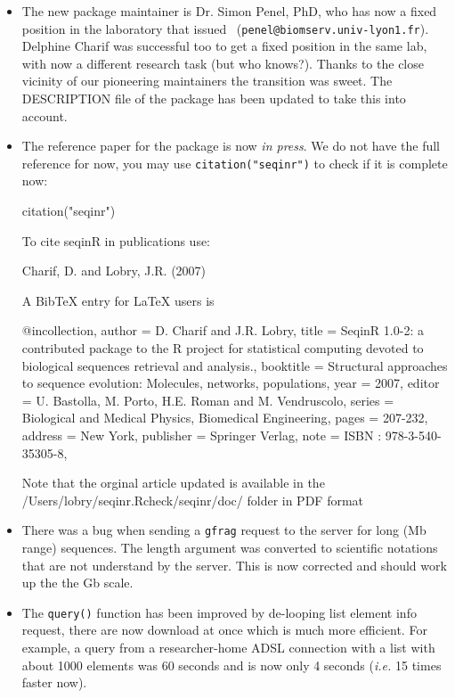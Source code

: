 \documentclass{article}
\begin{document}
\begin{itemize}
\item The new package maintainer is Dr. Simon Penel, PhD, who has now a fixed position in the
laboratory that issued \seqinr~(\texttt{penel@biomserv.univ-lyon1.fr}). Delphine Charif was
successful too to get a fixed position in the same lab, with now a different research task (but who knows?).
Thanks to the close vicinity of our pioneering maintainers the transition was sweet. The DESCRIPTION
file of the \seqinr{} package has been updated to take this into account.

\item The reference paper for the package is now \textit{in press}. We do not have the full
reference for now, you may use \texttt{citation("seqinr")} to check if it is complete now:
\begin{Schunk}
\begin{Sinput}
 citation("seqinr")
\end{Sinput}
\begin{Soutput}
To cite seqinR in publications use:

  Charif, D. and Lobry, J.R. (2007)

A BibTeX entry for LaTeX users is

  @incollection{,
    author = {D. Charif and J.R. Lobry},
    title = {Seqin{R} 1.0-2: a contributed package to the {R} project for statistical computing devoted to biological sequences retrieval and analysis.},
    booktitle = {Structural approaches to sequence evolution: Molecules, networks, populations},
    year = {2007},
    editor = {U. Bastolla, M. Porto, H.E. Roman and M. Vendruscolo},
    series = {Biological and Medical Physics, Biomedical Engineering},
    pages = {207-232},
    address = {New York},
    publisher = {Springer Verlag},
    note = {{ISBN :} 978-3-540-35305-8},
  }

Note that the orginal article updated is available in the
/Users/lobry/seqinr.Rcheck/seqinr/doc/ folder in PDF format
\end{Soutput}
\end{Schunk}

\item There was a bug when sending a \texttt{gfrag} request to the server for long (Mb range) 
sequences. The length argument was converted to scientific notations that are not understand by the
server. This is now corrected and should work up the the Gb scale.

\item The \texttt{query()} function has been improved by de-looping list element info request,
there are now download at once which is much more efficient. For example, a query from a
researcher-home ADSL connection with a list with about 1000 elements was 60 seconds and
is now only 4 seconds (\textit{i.e.} 15 times faster now).


\end{itemize}
\end{document}
